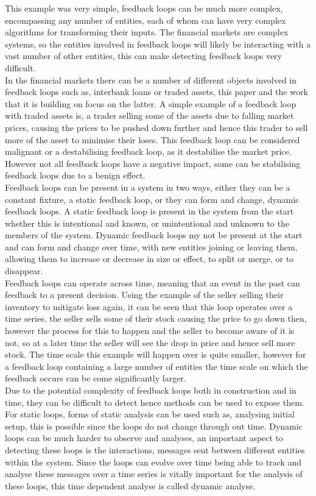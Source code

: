 \documentclass{article}
\begin{document}
This example was very simple, feedback loops can be much more complex, encompassing any number of entities, each of whom can have very complex algorithms for transforming their inputs. The financial markets are complex systems, so the entities involved in feedback loops will likely be interacting with a vast number of other entities, this can make detecting feedback loops very difficult.\\ %
In the financial markets there can be a number of different objects involved in feedback loops such as, interbank loans or traded assets, this paper and the work that it is building on focus on the latter. A simple example of a feedback loop with traded assets is, a trader selling some of the assets due to falling market prices, causing the prices to be pushed down further and hence this trader to sell more of the asset to minimise their loses. This feedback loop can be considered malignant or a destabilising feedback loop, as it destabilise the market price. However not all feedback loops have a negative impact, some can be stabilising feedback loops due to a benign effect.\\      
Feedback loops can be present in a system in two ways, either they can be a constant fixture, a static feedback loop, or they can form and change, dynamic feedback loops. A static feedback loop is present in the system from the start whether this is intentional and known, or unintentional and unknown to the members of the system. Dynamic feedback loops my not be present at the start and can form and change over time, with new entities joining or leaving them, allowing them to increase or decrease in size or effect, to split or merge, or to disappear.\\
Feedback loops can operate across time, meaning that an event in the past can feedback to a present decision. Using the example of the seller selling their inventory to mitigate loss again, it can be seen that this loop operates over a time series, the seller sells some of their stock causing the price to go down then, however the process for this to happen and the seller to become aware of it is not, so at a later time the seller will see the drop in price and hence sell more stock. The time scale this example will happen over is quite smaller, however for a feedback loop containing a large number of entities the time scale on which the feedback occurs can be come significantly larger.\\
Due to the potential complexity of feedback loops both in construction and in time, they can be difficult to detect hence methods can be used to expose them. For static loops, forms of static analysis can be used such as, analysing initial setup, this is possible since the loops do not change through out time. Dynamic loops can be much harder to observe and analyses, an important aspect to detecting these loops is the interactions, messages sent between different entities within the system. Since the loops can evolve over time being able to track and analyse these messages over a time series is vitally important for the analysis of these loops, this time dependent analyse is called dynamic analyse.             
\end{document}
